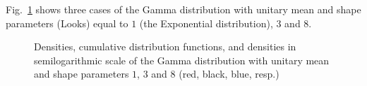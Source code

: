 \documentclass{beamer}
\begin{document}
\begin{frame}
Fig.~\ref{Fig:GammaDistribution} shows three cases of the Gamma distribution with unitary mean and shape parameters (Looks) equal to $1$ (the Exponential distribution), $3$ and $8$.


\begin{figure}[hbt]
\centering
{}
\caption[Densities, cumulative distribution functions, and densities in semilogarithmic scale of the Gamma distribution with unitary mean and shape parameters $1$, $3$ and $8$]{Densities, cumulative distribution functions, and densities in semilogarithmic scale of the Gamma distribution with unitary mean and shape parameters $1$, $3$ and $8$ (red, black, blue, resp.)}\label{Fig:GammaDistribution}
\end{figure}
\end{frame}
\end{document}
